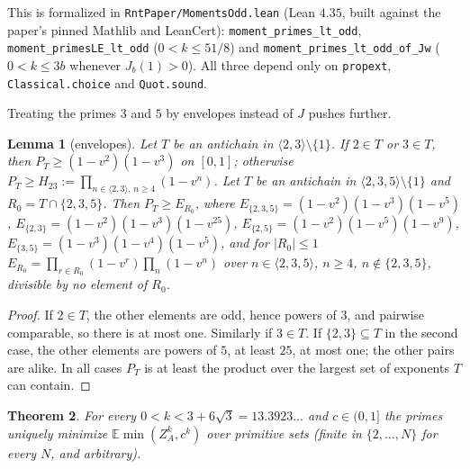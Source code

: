 \documentclass[11pt]{article}
\newtheorem{theorem}{Theorem}[section]
\newtheorem{lemma}[theorem]{Lemma}
\theoremstyle{remark}
\newcommand{\E}{\mathbb{E}}
\newcommand{\sm}[1]{\langle #1\rangle}
\begin{document}
This is formalized in \texttt{RntPaper/MomentsOdd.lean} (Lean $4.35$, built against the
paper's pinned Mathlib and LeanCert): \texttt{moment\_primes\_lt\_odd},
\texttt{moment\_primesLE\_lt\_odd} ($0<k\le51/8$) and \texttt{moment\_primes\_lt\_odd\_of\_Jw}
($0<k\le3b$ whenever $J_b(1)>0$). All three depend only on \texttt{propext},
\texttt{Classical.choice} and \texttt{Quot.sound}.

Treating the primes $3$ and $5$ by envelopes instead of $J$ pushes further.

\begin{lemma}[envelopes]\label{lem:env}
Let $T$ be an antichain in $\sm{2,3}\setminus\{1\}$. If $2\in T$ or $3\in T$, then
$P_T\ge(1-v^2)(1-v^3)$ on $[0,1]$; otherwise $P_T\ge H_{23}:=\prod_{n\in\sm{2,3},\,n\ge4}(1-v^n)$.
Let $T$ be an antichain in $\sm{2,3,5}\setminus\{1\}$ and $R_0=T\cap\{2,3,5\}$. Then $P_T\ge E_{R_0}$,
where $E_{\{2,3,5\}}=(1-v^2)(1-v^3)(1-v^5)$, $E_{\{2,3\}}=(1-v^2)(1-v^3)(1-v^{25})$,
$E_{\{2,5\}}=(1-v^2)(1-v^5)(1-v^9)$, $E_{\{3,5\}}=(1-v^3)(1-v^4)(1-v^5)$, and for $|R_0|\le1$
$E_{R_0}=\prod_{r\in R_0}(1-v^r)\prod_n(1-v^n)$ over $n\in\sm{2,3,5}$, $n\ge4$, $n\notin\{2,3,5\}$,
divisible by no element of $R_0$.
\end{lemma}

\begin{proof}
If $2\in T$, the other elements are odd, hence powers of $3$, and pairwise comparable, so
there is at most one. Similarly if $3\in T$. If $\{2,3\}\subseteq T$ in the second case, the other
elements are powers of $5$, at least $25$, at most one; the other pairs are alike. In all
cases $P_T$ is at least the product over the largest set of exponents $T$ can contain.
\end{proof}

\begin{theorem}\label{thm:1339}
For every $0<k<3+6\sqrt3=13.3923\ldots$ and $c\in(0,1]$ the primes uniquely minimize
$\E\min(Z_A^k,c^k)$ over primitive sets (finite in $\{2,\dots,N\}$ for every $N$, and arbitrary).
\end{theorem}
\end{document}
